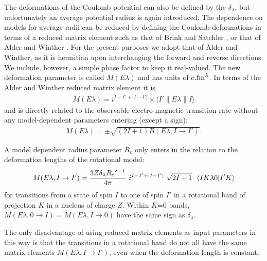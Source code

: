 \documentclass[11pt,a4paper]{article}
\begin{document}
The deformations of the Coulomb potential can also be defined by the
$\delta_\lambda$, but unfortunately an average potential radius is
again introduced.  The dependence on models for average radii can be
reduced by defining the Coulomb deformations in terms of a reduced matrix
element such as that of Brink and Satchler \cite{bs68}, or that of Alder and Winther
\cite{alder66}.
For the present purposes we adopt that of Alder and Winther, as it is
hermitian upon interchanging the forward and reverse directions.
We include, however,
a simple phase factor to keep it real-valued.  The new deformation
parameter is called $M(E \lambda)$ and has units of $e . {\rm fm}^\lambda $.
In terms of the Alder and Winther reduced matrix element it is
\begin{eqnarray}
  M(E \lambda) = i^{ I - I' + | I - I' |} \times
            \langle I' \| E \lambda \| I\rangle
\end{eqnarray}
and is directly related to the observable electro-magnetic transition
rate without any model-dependent parameters entering (except a sign):
\begin{eqnarray}
   M(E \lambda) =\pm\sqrt { (2I+1) B(E \lambda , I \rightarrow I') }.
\end{eqnarray}

A model dependent radius parameter $R_c$
only enters in the relation to the
deformation lengths of the rotational model:
\begin{eqnarray} \label{MEk}
   M(E \lambda , I \rightarrow I') =
               {3Z \delta_\lambda {R_c}^{\lambda-1} \over 4 \pi} ~
               i^{ I - I' + | I - I' |} ~
               \sqrt {2I+1} ~~\langle I K \lambda 0 | I' K\rangle
\end{eqnarray}
for transitions from a state of spin $I$ to one of spin $I'$
in a rotational band of projection $K$ in a nucleus of charge $Z$.
Within $K$=0 bands, $M(E \lambda , 0 \rightarrow I) = M(E \lambda , I \rightarrow 0) $
have the same sign as $\delta_\lambda$.

The only disadvantage of using reduced matrix elements as input parameters
in this way is
that the transitions in a rotational band do not all have the same
matrix elements $M(E \lambda , I \rightarrow I')$,
even when the deformation length is constant.
\end{document}
